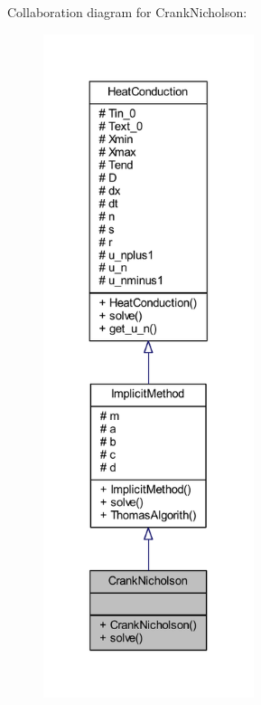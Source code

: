 Collaboration diagram for Crank\+Nicholson\+:
\nopagebreak
\begin{figure}[H]
\begin{center}
\leavevmode
\includegraphics[height=550pt]{class_crank_nicholson__coll__graph}
\end{center}
\end{figure}
